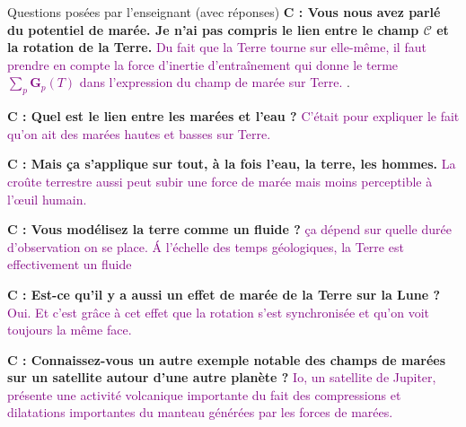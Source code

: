 \begin{reportBlock}{Questions posées par l’enseignant (avec réponses)}
  \textbf{C : Vous nous avez parlé du potentiel de marée. Je n'ai pas compris le lien entre le champ $\mathbf{\mathcal{C}}$ et la rotation de la Terre.}  \textcolor{purple}{Du fait que la Terre tourne sur elle-même, il faut prendre en compte la force d'inertie d'entraînement qui donne le terme $\sum_{p}\mathbf{G}_{p}(T)$ dans l'expression du champ de marée sur Terre. %
  }.\newline
  
  \textbf{C : Quel est le lien entre les marées et l'eau ?}  \textcolor{purple}{C'était pour expliquer le fait qu'on ait des marées hautes et basses sur Terre.}\newline
  
  \textbf{C : Mais ça s'applique sur tout, à la fois l'eau, la terre, les hommes.}  \textcolor{purple}{La croûte terrestre aussi peut subir une force de marée mais moins perceptible à l'\oe uil humain. }\newline
  
  \textbf{C : Vous modélisez la terre comme un fluide ?}  \textcolor{purple}{ça dépend sur quelle durée d'observation on se place. \'{A} l'échelle des temps géologiques, la Terre est effectivement un fluide}\newline
  
  \textbf{C : Est-ce qu'il y a aussi un effet de marée de la Terre sur la Lune ?}  \textcolor{purple}{Oui. Et c'est grâce à cet effet que la rotation s'est synchronisée et qu'on voit toujours la même face.}\newline
  
  \textbf{C : Connaissez-vous un autre exemple notable des champs de marées sur un satellite autour d'une autre planète ?}  \textcolor{purple}{Io, un satellite de Jupiter, présente une activité volcanique importante du fait des compressions et dilatations importantes du manteau générées par les forces de marées. }\newline
  

\end{reportBlock}
